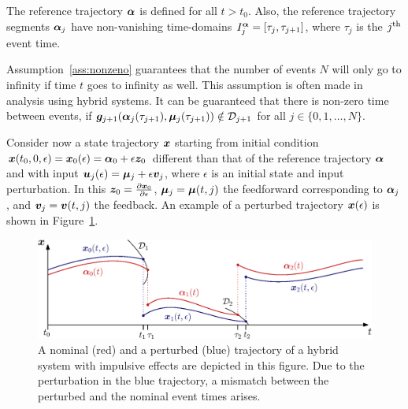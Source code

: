 \documentclass[../DC2017114Bouma.tex]{subfiles}
\begin{document}
\begin{myass}
The reference trajectory $\boldsymbol{\alpha}$ is defined for all $t>t_0$. Also, the reference trajectory segments $\boldsymbol{\alpha}_j$ have non-vanishing time-domains $I^{\boldsymbol{\alpha}}_j=[\tau_j,\tau_{j+1}]$, where $\tau_j$ is the $j^{\textnormal{th}}$ event time.\label{ass:nonzeno}
\end{myass}

Assumption~\ref{ass:nonzeno} guarantees that the number of events $N$ will only go to infinity if time $t$ goes to infinity as well. This assumption is often made in analysis using hybrid systems. It can be guaranteed that there is non-zero time between events, if ${\boldsymbol{g}}_{j+1}(\boldsymbol{\alpha}_j(\tau_{j+1}),\boldsymbol{\mu}_j(\tau_{j+1}))\notin \mathcal{D}_{j+1}$ for all $j\in\{0,1,\dots,N\}$.

Consider now a state trajectory ${\boldsymbol{x}}$ starting from initial condition ${\boldsymbol{x}}(t_0,0,\epsilon)={\boldsymbol{x}}_0(\epsilon)=\boldsymbol{\alpha}_0+\epsilon {\boldsymbol{z}}_0$ different than that of the reference trajectory $\boldsymbol{\alpha}$ and with input ${\boldsymbol{u}}_j(\epsilon)=\boldsymbol{\mu}_j+\epsilon {\boldsymbol{v}}_j$, where $\epsilon$ is an initial state and input perturbation. In this ${\boldsymbol{z}}_0 = \frac{\partial{\boldsymbol{x}}_0}{\partial\epsilon}$, $\boldsymbol{\mu}_j = \boldsymbol{\mu}(t,j)$ the feedforward corresponding to $\boldsymbol{\alpha}_j$, and ${\boldsymbol{v}}_j = {\boldsymbol{v}}(t,j)$ the feedback. An example of a perturbed trajectory ${\boldsymbol{x}}(\epsilon)$ is shown in Figure~\ref{fig:3perturbedtraj}.

%
%
\begin{figure}[h]
\centering
\includegraphics[width=.9\textwidth]{perturbedtraj.eps}\caption{A nominal (red) and a perturbed (blue) trajectory of a hybrid system with impulsive effects are depicted in this figure. Due to the perturbation in the blue trajectory, a mismatch between the perturbed and the nominal event times arises.} \label{fig:3perturbedtraj}
\end{figure}
\end{document}
